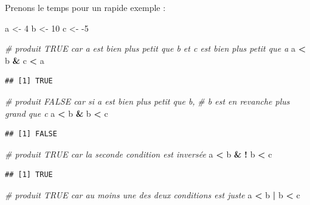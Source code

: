 \documentclass[
  11pt,
  french,
]{book}
\makeatletter
\newenvironment{Shaded}{\begin{snugshade}}{\end{snugshade}}
\newcommand{\CommentTok}[1]{\textcolor[rgb]{0.56,0.35,0.01}{\textit{#1}}}
\newcommand{\DecValTok}[1]{\textcolor[rgb]{0.00,0.00,0.81}{#1}}
\newcommand{\NormalTok}[1]{#1}
\newcommand{\OperatorTok}[1]{\textcolor[rgb]{0.81,0.36,0.00}{\textbf{#1}}}
\newcommand{\StringTok}[1]{\textcolor[rgb]{0.31,0.60,0.02}{#1}}
\newenvironment{kframe}{%
\medskip{}
\setlength{\fboxsep}{.8em}
 \def\at@end@of@kframe{}%
 \ifinner\ifhmode%
  \def\at@end@of@kframe{\end{minipage}}%
  \begin{minipage}{\columnwidth}%
 \fi\fi%
 \def\FrameCommand##1{\hskip\@totalleftmargin \hskip-\fboxsep
 \colorbox{shadecolor}{##1}\hskip-\fboxsep
     \hskip-\linewidth \hskip-\@totalleftmargin \hskip\columnwidth}%
 \MakeFramed {\advance\hsize-\width
   \@totalleftmargin\z@ \linewidth\hsize
   \@setminipage}}%
 {\par\unskip\endMakeFramed%
 \at@end@of@kframe}
\renewenvironment{Shaded}{\begin{kframe}}{\end{kframe}}
\makeatother
\begin{document}
Prenons le temps pour un rapide exemple :

\begin{Shaded}
\begin{Highlighting}[]
\NormalTok{a <-}\StringTok{ }\DecValTok{4} 
\NormalTok{b <-}\StringTok{ }\DecValTok{10}
\NormalTok{c <-}\StringTok{ }\DecValTok{-5}

\CommentTok{# produit TRUE car a est bien plus petit que b et c est bien plus petit que a}
\NormalTok{a }\OperatorTok{<}\StringTok{ }\NormalTok{b }\OperatorTok{&}\StringTok{ }\NormalTok{c }\OperatorTok{<}\StringTok{ }\NormalTok{a}
\end{Highlighting}
\end{Shaded}

\begin{verbatim}
## [1] TRUE
\end{verbatim}

\begin{Shaded}
\begin{Highlighting}[]
\CommentTok{# produit FALSE car si a est bien plus petit que b, }
\CommentTok{# b est en revanche plus grand que c}
\NormalTok{a }\OperatorTok{<}\StringTok{ }\NormalTok{b }\OperatorTok{&}\StringTok{ }\NormalTok{b }\OperatorTok{<}\StringTok{ }\NormalTok{c}
\end{Highlighting}
\end{Shaded}

\begin{verbatim}
## [1] FALSE
\end{verbatim}

\begin{Shaded}
\begin{Highlighting}[]
\CommentTok{# produit TRUE car la seconde condition est inversée}
\NormalTok{a }\OperatorTok{<}\StringTok{ }\NormalTok{b }\OperatorTok{&}\StringTok{  }\OperatorTok{!}\StringTok{ }\NormalTok{b }\OperatorTok{<}\StringTok{ }\NormalTok{c}
\end{Highlighting}
\end{Shaded}

\begin{verbatim}
## [1] TRUE
\end{verbatim}

\begin{Shaded}
\begin{Highlighting}[]
\CommentTok{# produit TRUE car au moins une des deux conditions est juste}
\NormalTok{a }\OperatorTok{<}\StringTok{ }\NormalTok{b }\OperatorTok{|}\StringTok{  }\NormalTok{b }\OperatorTok{<}\StringTok{ }\NormalTok{c}
\end{Highlighting}
\end{Shaded}
\end{document}

